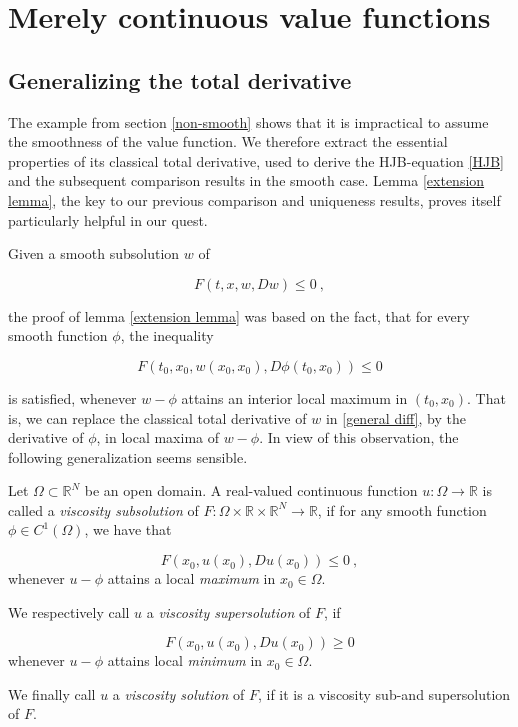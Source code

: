 
\chapter{Merely continuous value functions}

	\section{Generalizing the total derivative}
	
	The example from section \ref{non-smooth} shows that it is impractical to assume the smoothness of the value function. We therefore extract the essential properties of its classical total derivative, used to derive the HJB-equation \ref{HJB} and the subsequent comparison results in the smooth case. Lemma \ref{extension lemma}, the key to our previous comparison and uniqueness results, proves itself particularly helpful in our quest.
	
	Given a smooth subsolution $ w $ of
	
	\begin{equation}
		\label{general diff}
		F(t, x, w, Dw) \leq 0 \ ,
	\end{equation}
	
	the proof of lemma \ref{extension lemma} was based on the fact, that for every smooth function $ \phi $, the inequality 
	
	\begin{equation*}
		F(t_0, x_0, w(x_0, x_0), D\phi(t_0, x_0)) \leq 0
	\end{equation*}
	
	is satisfied, whenever $ w - \phi $ attains an interior local maximum in $ (t_0, x_0) $. That is, we can replace the classical total derivative of $ w $ in \ref{general diff}, by the derivative of $ \phi $, in local maxima of $ w - \phi $. In view of this observation, the following generalization seems sensible.
	
	\begin{definition}
		Let $ \Omega \subset \mathbb{R}^N $ be an open domain. A real-valued continuous function $ u : \Omega \to \mathbb{R} $ is called a \emph{viscosity subsolution} of $ F : \Omega \times \mathbb{R} \times \mathbb{R}^N \to \mathbb{R} $, if for any smooth function $ \phi \in C^1(\Omega) $, we have that
		
		\begin{equation}
			\label{def viscosity subsolution}
			F(x_0, u(x_0), Du(x_0)) \leq 0 \ ,
		\end{equation}
		whenever $ u - \phi $ attains a local \emph{maximum} in $ x_0 \in \Omega $.
		
		We respectively call $ u $ a \emph{viscosity supersolution} of $ F $, if
		
		\begin{equation}
			\label{def viscosity supersolution}
			F(x_0, u(x_0), Du(x_0)) \geq 0
		\end{equation}
		whenever $ u - \phi $ attains local \emph{minimum} in $ x_0 \in \Omega $. 
		
		We finally call $ u $ a \emph{viscosity solution} of $ F $, if it is a viscosity sub-and supersolution of $ F $.
	\end{definition}

